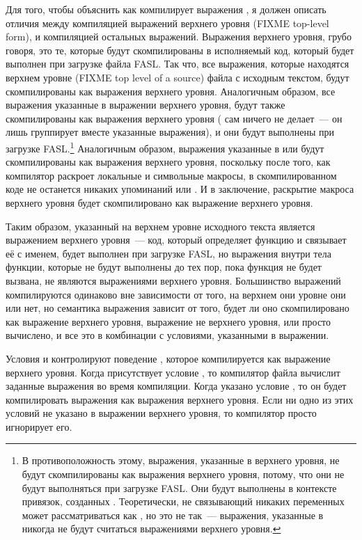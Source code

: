 Для того, чтобы объяснить как  компилирует выражения ,
я должен описать отличия между компиляцией выражений верхнего уровня (FIXME top-level
form), и компиляцией остальных выражений.  Выражения верхнего уровня, грубо говоря, это
те, которые будут скомпилированы в исполняемый код, который будет выполнен при загрузке
файла FASL.  Так что, все выражения, которые находятся верхнем уровне (FIXME top level of
a source) файла с исходным текстом, будут скомпилированы как выражения верхнего
уровня. Аналогичным образом, все выражения указанные в выражении  верхнего
уровня, будут также скомпилированы как выражения верхнего уровня ( сам ничего
не делает~--- он лишь группирует вместе указанные выражения), и они будут выполнены при
загрузке FASL.\footnote{В противоположность этому, выражения, указанные в 
  верхнего уровня, не будут скомпилированы как выражения верхнего уровня, потому, что они
  не будут выполняться при загрузке FASL.  Они будут выполнены в контексте привязок,
  созданных . Теоретически,  не связывающий никаких переменных может
  рассматриваться как , но это не так~--- выражения, указанные в 
  никогда не будут считаться выражениями верхнего уровня.}  Аналогичным образом, выражения
указанные в  или  будут скомпилированы как выражения
верхнего уровня, поскольку после того, как компилятор раскроет локальные и символьные
макросы, в скомпилированном коде не останется никаких упоминаний  или
.  И в заключение, раскрытие макроса верхнего уровня будет
скомпилировано как выражение верхнего уровня.

Таким образом,  указанный на верхнем уровне исходного текста является
выражением верхнего уровня~--- код, который определяет функцию и связывает её с именем,
будет выполнен при загрузке FASL, но выражения внутри тела функции, которые не будут
выполнены до тех пор, пока функция не будет вызвана, не являются выражениями верхнего
уровня.  Большинство выражений компилируются одинаково вне зависимости от того, на верхнем
они уровне они или нет, но семантика выражения  зависит от того, будет ли
оно скомпилировано как выражение верхнего уровня, выражение не верхнего уровня, или просто
вычислено, и все это в комбинации с условиями, указанными в выражении.

Условия  и  контролируют поведение
, которое компилируется как выражение верхнего уровня.  Когда присутствует
условие , то компилятор файла вычислит заданные выражения во время
компиляции.  Когда указано условие , то он будет компилировать
выражения как выражения верхнего уровня.  Если ни одно из этих условий не указано в
выражении  верхнего уровня, то компилятор просто игнорирует его.

